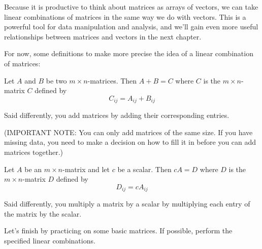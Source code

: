 \documentclass{ximera}
\begin{document}
\begin{exploration}

\begin{remark}

  Because it is productive to think about matrices as arrays of vectors, we can take linear combinations of matrices in the same way we do with vectors. This is a powerful tool for data manipulation and analysis, and we'll gain even more useful relationships between matrices and vectors in the next chapter.

  For now, some definitions to make more precise the idea of a linear combination of matrices:

  \begin{definition}
    Let $A$ and $B$ be two
    $m\times n$-matrices. Then $A+B=C$%
     where $C$ is the $m\times n$-matrix
    $C$ defined by
    \begin{equation*}
      C_{ij}=A_{ij}+B_{ij}
    \end{equation*}

    Said differently, you add matrices by adding their corresponding entries.

    (IMPORTANT NOTE: You can only add matrices of the same size. If you have missing data, you need to make a decision on how to fill it in before you can add matrices together.)
  \end{definition}

  \begin{definition}
    Let $A$ be an $m\times n$-matrix and let $c$ be a scalar. Then $cA=D$%
     where $D$ is the $m\times n$-matrix
    $D$ defined by
    \begin{equation*}
      D_{ij}=cA_{ij}
    \end{equation*}

    Said differently, you multiply a matrix by a scalar by multiplying each entry of the matrix by the scalar.
  \end{definition}

\end{remark}

Let's finish by practicing on some basic matrices. If possible, perform the specified linear combinations.


\end{exploration}
\end{document}
